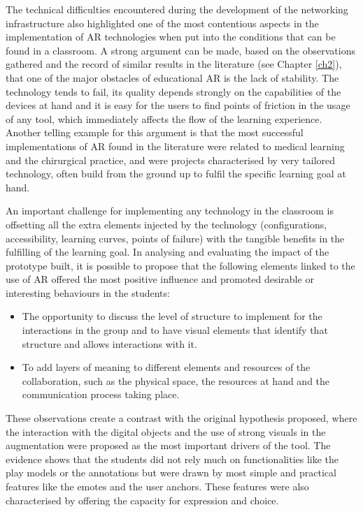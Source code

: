 The technical difficulties encountered during the development of the networking infrastructure also highlighted one of the most contentious aspects in the implementation of \ac{AR}
technologies when put into the conditions that can be found in a classroom. A strong argument can be made, based on the observations gathered and the record of similar results in the
literature (see Chapter \ref{ch2}), that one of the major obstacles of educational \ac{AR} is the lack of stability. The technology tends to fail, its quality depends strongly on the
capabilities of the devices at hand and it is easy for the users to find points of friction in the usage of any tool, which immediately affects the flow of the learning experience. Another
telling example for this argument is that the most successful implementations of \ac{AR} found in the literature were related to medical learning and the chirurgical practice, and were
projects characterised by very tailored technology, often build from the ground up to fulfil the specific learning goal at hand.

An important challenge for implementing any technology in the classroom is offsetting all the extra elements injected by the technology (configurations, accessibility, learning curves,
points of failure) with the tangible benefits in the fulfilling of the learning goal. In analysing and evaluating the impact of the prototype built, it is possible to propose that the
following elements linked to the use of \ac{AR} offered the most positive influence and promoted desirable or interesting behaviours in the students:

\begin{itemize}
    \item The opportunity to discuss the level of structure to implement for the interactions in the group and to have visual elements that identify that structure and allows interactions
    with it.
    \item To add layers of meaning to different elements and resources of the collaboration, such as the physical space, the resources at hand and the communication process taking place.
\end{itemize}

These observations create a contrast with the original hypothesis proposed, where the interaction with the digital objects and the use of strong visuals in the augmentation were proposed
as the most important drivers of the tool. The evidence shows that the students did not rely much on functionalities like the play models or the annotations but were drawn by most simple
and practical features like the emotes and the user anchors. These features were also characterised by offering the capacity for expression and choice.

